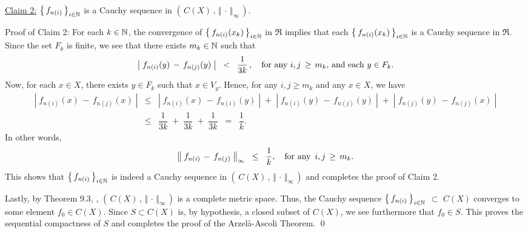 \vskip 0.3cm
\begin{center}
\begin{minipage}{6.0in}
\noindent
\underline{Claim 2:}\quad
$\left\{\,f_{n(i)}\,\right\}_{i\in\mathbb{N}}$ is a Cauchy sequence in $\left(\,C(X)\,,\,\Vert\,\cdot\,\Vert_{\infty}\,\right)$.
\end{minipage}
\end{center}
Proof of Claim 2:\; For each $k \in \mathbb{N}$, the convergence of $\left\{\,f_{n(i)}(x_{k})\,\right\}_{i\in\mathbb{N}}$ in $\Re$
implies that each $\left\{\,f_{n(i)}(x_{k})\,\right\}_{i\in\mathbb{N}}$ is a Cauchy sequence in $\Re$.
Since the set $F_{k}$ is finite, we see that there exists $m_{k} \in \mathbb{N}$ such that
\begin{equation*}
\left\vert\; f_{n(i)}(y) \,-\, f_{n(j)}(y) \;\right\vert \;\; < \;\; \dfrac{1}{3k}\,,
\quad
\textnormal{for any $i, j \,\geq\, m_{k}$, and each $y \in F_{k}$}.
\end{equation*}
Now, for each $x \in X$, there exists $y \in F_{k}$ such that $x \in V_{y}$.
Hence, for any $i, j \geq m_{k}$ and any $x \in X$, we have
\begin{eqnarray*}
\left\vert\; f_{n(i)}(x) \,-\, f_{n(j)}(x) \;\right\vert
&\leq& \left\vert\; f_{n(i)}(x) \,-\, f_{n(i)}(y) \;\right\vert
	\;+\; \left\vert\; f_{n(i)}(y) \,-\, f_{n(j)}(y) \;\right\vert
	\;+\; \left\vert\; f_{n(j)}(y) \,-\, f_{n(j)}(x) \;\right\vert
\\
&\leq& \dfrac{1}{3k} \;+\; \dfrac{1}{3k} \;+\; \dfrac{1}{3k} \;\; = \;\; \dfrac{1}{k}.
\end{eqnarray*}
In other words,
\begin{equation*}
\left\Vert\; f_{n(i)} \,-\, f_{n(j)}\;\right\Vert_{\infty} \;\; \leq \;\; \dfrac{1}{k},
\quad\textnormal{for any \,$i, j \,\geq\, m_{k}$}.
\end{equation*}
This shows that
$\left\{\,f_{n(i)}\,\right\}_{i\in\mathbb{N}}$ is indeed a Cauchy sequence in $\left(\,C(X)\,,\,\Vert\,\cdot\,\Vert_{\infty}\,\right)$
and completes the proof of Claim 2.

\vskip 0.3cm
\noindent
Lastly, by Theorem 9.3, \cite{Aliprantis1998}, $\left(\,C(X)\,,\,\Vert\,\cdot\,\Vert_{\infty}\,\right)$ is a complete metric space.
Thus, the Cauchy sequence
$\left\{\,f_{n(i)}\,\right\}_{i\in\mathbb{N}}$ $\subset$ $C(X)$ converges to some element $f_{0} \in C(X)$.
Since $S \subset C(X)$ is, by hypothesis, a closed subset of $C(X)$, we see furthermore that $f_{0} \in S$.
This proves the sequential compactness of $S$ and completes the proof of the Arzel\`{a}-Ascoli Theorem.
\qed

